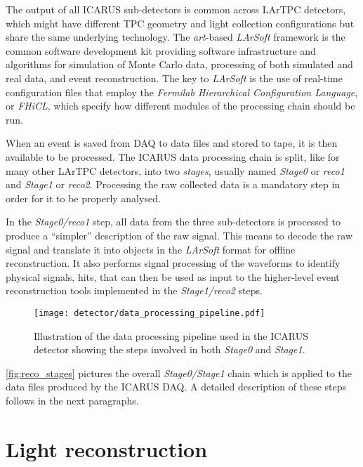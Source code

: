 The output of all ICARUS sub-detectors is common across LArTPC detectors, which might have different TPC geometry and light collection configurations but share the same underlying technology. The \emph{art}-based \emph{LArSoft} framework \cite{Church:2013hea,Snider:2017wjd,Pordes:2017BL} is the common software development kit providing software infrastructure and algorithms for simulation of Monte Carlo data, processing of both simulated and real data, and event reconstruction. The key to \emph{LArSoft} is the use of real-time configuration files that employ the \emph{Fermilab Hierarchical Configuration Language}, or \emph{FHiCL}, which specify how different modules of the processing chain should be run. 

When an event is saved from DAQ to data files and stored to tape, it is then available to be processed. The ICARUS data processing chain is split, like for many other LArTPC detectors, into two \emph{stages}, usually named \emph{Stage0} or \emph{reco1} and \emph{Stage1} or \emph{reco2}. Processing the raw collected data is a mandatory step in order for it to be properly analysed. 

In the \emph{Stage0/reco1} step, all data  from the three sub-detectors is processed to produce a ``simpler'' description of the raw signal. This means to decode the raw signal and translate it into objects in the \emph{LArSoft} format for offline reconstruction. It also performs signal processing of the waveforms to identify physical signals, hits, that can then be used as input to the higher-level event reconstruction tools implemented in the \emph{Stage1/reco2} steps. 

\begin{figure}
    \centering
    \texttt{[image: detector/data\_processing\_pipeline.pdf]}
    \caption[\emph{Stage0} and \emph{Stage1} data processing pipeline]{Illustration of the data processing pipeline used in the ICARUS detector showing the steps involved in both \emph{Stage0} and \emph{Stage1}. }
    \label{fig:reco_stages}
\end{figure}

\autoref{fig:reco_stages} pictures the overall \emph{Stage0/Stage1} chain which is applied to the data files produced by the ICARUS DAQ. A detailed description of these steps follows in the next paragraphs. 

\section{Light reconstruction}

